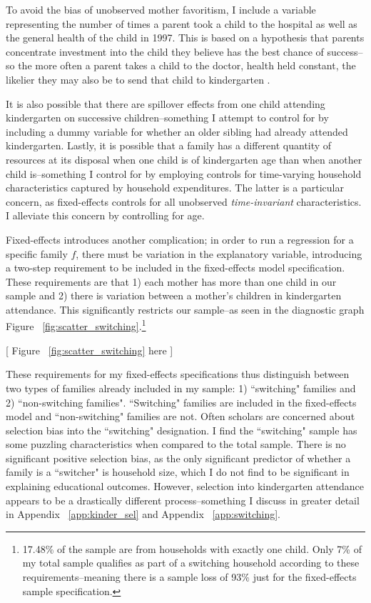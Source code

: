To avoid the bias of unobserved mother favoritism, I include a variable representing the number of times a parent took a child to the hospital as well as the general health of the child in 1997. This is based on a hypothesis that parents concentrate investment into the child they believe has the best chance of success--so the more often a parent takes a child to the doctor, health held constant, the likelier they may also be to send that child to kindergarten \citep{Duflo2011}. 

It is also possible that there are spillover effects from one child attending kindergarten on successive children--something I attempt to control for by including a dummy variable for whether an older sibling had already attended kindergarten. Lastly, it is possible that a family has a different quantity of resources at its disposal when one child is of kindergarten age than when another child is--something I control for by employing controls for time-varying household characteristics captured by household expenditures. The latter is a particular concern, as fixed-effects controls for all unobserved \textit{time-invariant} characteristics. I alleviate this concern by controlling for age.

Fixed-effects introduces another complication; in order to run a regression for a specific family $f$, there must be variation in the explanatory variable, introducing a two-step requirement to be included in the fixed-effects model specification. These requirements are that 1) each mother has more than one child in our sample and 2) there is variation between a mother's children in kindergarten attendance. This significantly restricts our sample--as seen in the diagnostic graph Figure ~\ref{fig:scatter_switching}.\footnote{17.48\% of the sample are from households with exactly one child. Only 7\% of my total sample qualifies as part of a switching household according to these requirements--meaning there is a sample loss of 93\% just for the fixed-effects sample specification.}
\begin{center}
	[ Figure ~\ref{fig:scatter_switching} here ]
\end{center}
These requirements for my fixed-effects specifications thus distinguish between two types of families already included in my sample: 1) ``switching" families and 2) ``non-switching families". \citep{Miller2023} ``Switching" families are included in the fixed-effects model and ``non-switching" families are not. Often scholars are concerned about selection bias into the ``switching" designation. I find the ``switching" sample has some puzzling characteristics when compared to the total sample. There is no significant positive selection bias, as the only significant predictor of whether a family is a ``switcher" is household size, which I do not find to be significant in explaining educational outcomes. However, selection into kindergarten attendance appears to be a drastically different process--something I discuss in greater detail in Appendix ~\ref{app:kinder_sel} and Appendix ~\ref{app:switching}. 

